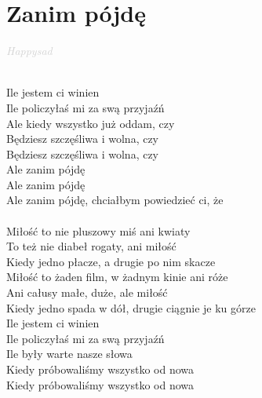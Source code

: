 \documentclass[a5paper, 10pt]{book}
\begin{document}
\section{Zanim pójdę}\textcolor{lightgray}{\textit{Happysad}}\\~\\
\begin{minipage}[t]{0.8\textwidth}
Ile jestem ci winien\\
Ile policzyłaś mi za swą przyjaźń\\
Ale kiedy wszystko już oddam, czy\\
Będziesz szczęśliwa i wolna, czy\\
Będziesz szczęśliwa i wolna, czy\\

\hspace*{5mm}Ale zanim pójdę\\
\hspace*{5mm}Ale zanim pójdę\\
\hspace*{5mm}Ale zanim pójdę, chciałbym powiedzieć ci, że\\
\hspace*{5mm}\\
\hspace*{5mm}Miłość to nie pluszowy miś ani kwiaty\\
\hspace*{5mm}To też nie diabeł rogaty, ani miłość\\
\hspace*{5mm}Kiedy jedno płacze, a drugie po nim skacze\\
\hspace*{5mm}Miłość to żaden film, w żadnym kinie ani róże\\
\hspace*{5mm}Ani całusy małe, duże, ale miłość\\
\hspace*{5mm}Kiedy jedno spada w dół, drugie ciągnie je ku górze\\

Ile jestem ci winien\\
Ile policzyłaś mi za swą przyjaźń\\
Ile były warte nasze słowa\\
Kiedy próbowaliśmy wszystko od nowa\\
Kiedy próbowaliśmy wszystko od nowa\\
\end{minipage}
\end{document}
